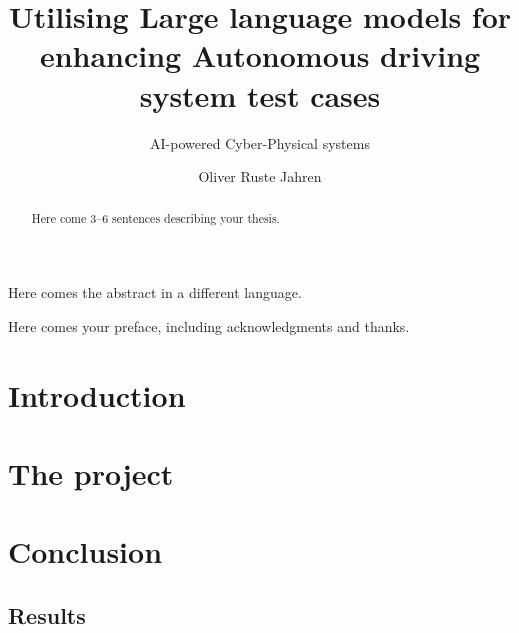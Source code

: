 \documentclass[UKenglish]{uiomasterthesis}  %
\title{Utilising Large language models for enhancing Autonomous driving system test cases }
\subtitle{AI-powered Cyber-Physical systems}         %
\author{Oliver Ruste Jahren}                      %
\begin{document}
\uiomasterfp[dept={Department of Informatics},  %
  program={Informatics: Programming and Systems architecture},                        %
  supervisor={Shaukat Ali \and Karoline Nylænder},                    %
  long]                                     %

\frontmatter{}
\begin{abstract}
  Here come 3--6 sentences describing your thesis.
\end{abstract}

\begin{xabstract}[Sammendrag]               %
  Here comes the abstract in a different language.
\end{xabstract}

\tableofcontents{}                          %
\listoffigures{}                            %
\listoftables{}                             %

\begin{preface}
  Here comes your preface, including acknowledgments and thanks.
\end{preface}

\mainmatter{}
\part{Introduction}                   %



\part{The project}                    %




\part{Conclusion}                     %
\chapter{Results}                     %

\backmatter{}
\printbibliography{}
\end{document}
